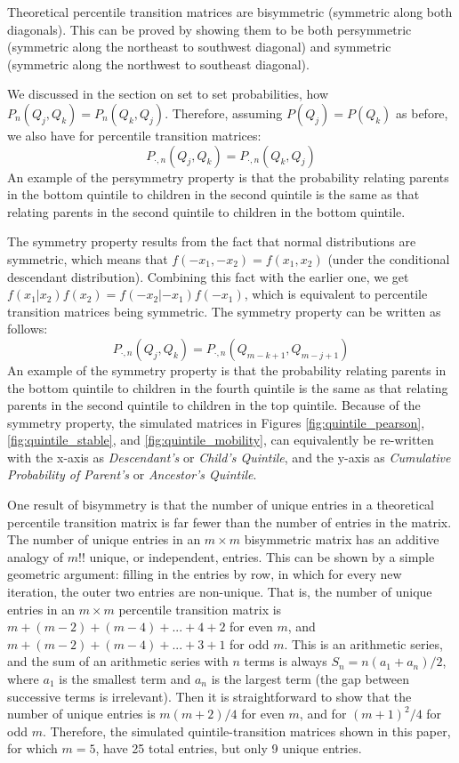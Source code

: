 \documentclass[a4paper,11pt]{article} %
\begin{document}
Theoretical percentile transition matrices are bisymmetric (symmetric along both diagonals). This can be proved by showing them to be both persymmetric (symmetric along the northeast to southwest diagonal) and symmetric (symmetric along the northwest to southeast diagonal). 

We discussed in the section on set to set probabilities, how $P_n(Q_j, Q_k) = P_n(Q_k, Q_j)$. Therefore, assuming  $P(Q_j) = P(Q_k)$ as before, we also have for percentile transition matrices: 
$$P_{ \cdot, n}(Q_j, Q_k) = P_{\cdot, n}(Q_k, Q_j)$$
An example of the persymmetry property is that the probability relating parents in the bottom quintile to children in the second quintile is the same as that relating parents in the second quintile to children in the bottom quintile.

The symmetry property results from the fact that normal distributions are symmetric, which means that $f(-x_1,-x_2) = f(x_1,x_2)$ (under the conditional descendant distribution). Combining this fact with the earlier one, we get $f(x_1|x_2)f(x_2) = f(-x_2|-x_1)f(-x_1)$, which is equivalent to percentile transition matrices being symmetric. The symmetry property can be written as follows:
$$P_{ \cdot, n}(Q_j, Q_k) = P_{\cdot, n}(Q_{m-k+1}, Q_{m-j+1})$$
An example of the symmetry property is that the probability relating parents in the bottom quintile to children in the fourth quintile is the same as that relating parents in the second quintile to children in the top quintile. Because of the symmetry property, the simulated matrices in Figures \ref{fig:quintile_pearson}, \ref{fig:quintile_stable}, and \ref{fig:quintile_mobility}, can equivalently be re-written with the x-axis as \emph{Descendant's} or \emph{Child's Quintile}, and the y-axis as \emph{Cumulative Probability of Parent's} or \emph{Ancestor's Quintile}. 

One result of bisymmetry is that the number of unique entries in a theoretical percentile transition matrix is far fewer than the number of entries in the matrix. The number of unique entries in an $m \times m$ bisymmetric matrix has an additive analogy of $m!!$ unique, or independent, entries. This can be shown by a simple geometric argument: filling in the entries by row, in which for every new iteration, the outer two entries are non-unique. That is, the number of unique entries in an $m \times m$ percentile transition matrix is $m + (m-2) + (m-4) + ... + 4 + 2$ for even $m$, and $m + (m-2) + (m-4) + ... + 3 + 1$ for odd $m$. This is an arithmetic series, and the sum of an arithmetic series with $n$ terms is always $S_n = n(a_1 + a_n) /2$, where $a_1$ is the smallest term and $a_n$ is the largest term (the gap between successive terms is irrelevant). Then it is straightforward to show that the number of unique entries is $m(m+2)/4$ for even $m$, and for $(m+1)^2/4$ for odd $m$. Therefore, the simulated quintile-transition matrices shown in this paper, for which $m = 5$, have 25 total entries, but only 9 unique entries.
\end{document}
